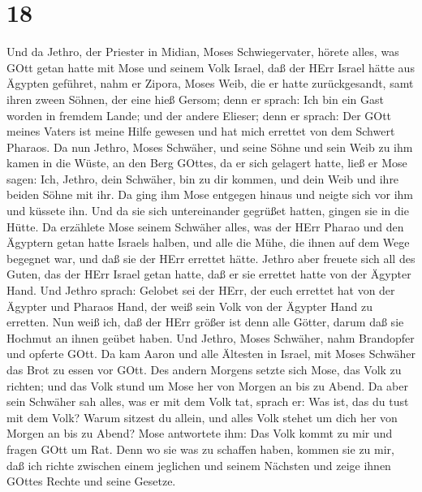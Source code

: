 \hypertarget{section-17}{%
\section{18}\label{section-17}}

 Und da Jethro, der Priester in Midian, Moses
Schwiegervater, hörete alles, was GOtt getan hatte mit Mose und seinem
Volk Israel, daß der HErr Israel hätte aus Ägypten geführet,
 nahm er Zipora, Moses Weib, die er hatte zurückgesandt,
 samt ihren zween Söhnen, der eine hieß Gersom; denn er
sprach: Ich bin ein Gast worden in fremdem Lande;  und der
andere Elieser; denn er sprach: Der GOtt meines Vaters ist meine Hilfe
gewesen und hat mich errettet von dem Schwert Pharaos.  Da
nun Jethro, Moses Schwäher, und seine Söhne und sein Weib zu ihm kamen
in die Wüste, an den Berg GOttes, da er sich gelagert hatte,
 ließ er Mose sagen: Ich, Jethro, dein Schwäher, bin zu dir
kommen, und dein Weib und ihre beiden Söhne mit ihr.  Da
ging ihm Mose entgegen hinaus und neigte sich vor ihm und küssete ihn.
Und da sie sich untereinander gegrüßet hatten, gingen sie in die Hütte.
 Da erzählete Mose seinem Schwäher alles, was der HErr
Pharao und den Ägyptern getan hatte Israels halben, und alle die Mühe,
die ihnen auf dem Wege begegnet war, und daß sie der HErr errettet
hätte.  Jethro aber freuete sich all des Guten, das der HErr
Israel getan hatte, daß er sie errettet hatte von der Ägypter Hand.
 Und Jethro sprach: Gelobet sei der HErr, der euch errettet
hat von der Ägypter und Pharaos Hand, der weiß sein Volk von der Ägypter
Hand zu erretten.  Nun weiß ich, daß der HErr größer ist
denn alle Götter, darum daß sie Hochmut an ihnen geübet haben.
 Und Jethro, Moses Schwäher, nahm Brandopfer und opferte
GOtt. Da kam Aaron und alle Ältesten in Israel, mit Moses Schwäher das
Brot zu essen vor GOtt.  Des andern Morgens setzte sich
Mose, das Volk zu richten; und das Volk stund um Mose her von Morgen an
bis zu Abend.  Da aber sein Schwäher sah alles, was er mit
dem Volk tat, sprach er: Was ist, das du tust mit dem Volk? Warum
sitzest du allein, und alles Volk stehet um dich her von Morgen an bis
zu Abend?  Mose antwortete ihm: Das Volk kommt zu mir und
fragen GOtt um Rat.  Denn wo sie was zu schaffen haben,
kommen sie zu mir, daß ich richte zwischen einem jeglichen und seinem
Nächsten und zeige ihnen GOttes Rechte und seine Gesetze. 
